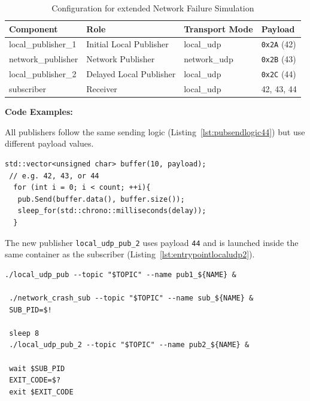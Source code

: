 \begin{table}[H]
	\centering
	\begin{tabular}{@{}llll@{}}
		\toprule
		\textbf{Component} & \textbf{Role} & \textbf{Transport Mode} & \textbf{Payload} \\
		\midrule
		local\_publisher\_1 & Initial Local Publisher & local\_udp & \texttt{0x2A} (42) \\
		network\_publisher & Network Publisher & network\_udp & \texttt{0x2B} (43) \\
		local\_publisher\_2 & Delayed Local Publisher & local\_udp & \texttt{0x2C} (44) \\
		subscriber & Receiver & local\_udp & 42, 43, 44 \\
		\bottomrule
	\end{tabular}
	\caption{Configuration for extended Network Failure Simulation}
	\label{tab:network_failure_sim_44}
\end{table}

\textbf{Code Examples:}

\vspace{0.4em}
All publishers follow the same sending logic (Listing~\ref{lst:pubsendlogic44}) but use different payload values.

\begin{lstlisting}[style=cppstyle, caption={General publisher loop}, label={lst:pubsendlogic44}, captionpos=b]
 std::vector<unsigned char> buffer(10, payload); 
 // e.g. 42, 43, or 44
  for (int i = 0; i < count; ++i){
   pub.Send(buffer.data(), buffer.size());
   sleep_for(std::chrono::milliseconds(delay));
  }
\end{lstlisting}

\vspace{0.4em}
The new publisher \texttt{local\_udp\_pub\_2} uses payload \texttt{44} and is launched inside the same container as the subscriber (Listing~\ref{lst:entrypointlocaludp2}).

\begin{lstlisting}[style=cppstyle, caption={Entrypoint launches second local publisher after delay}, label={lst:entrypointlocaludp2}, captionpos=b]
 ./local_udp_pub --topic "$TOPIC" --name pub1_${NAME} &
 
 ./network_crash_sub --topic "$TOPIC" --name sub_${NAME} &
 SUB_PID=$!
 
 sleep 8
 ./local_udp_pub_2 --topic "$TOPIC" --name pub2_${NAME} &
 
 wait $SUB_PID
 EXIT_CODE=$?
 exit $EXIT_CODE
\end{lstlisting}

